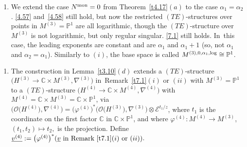 \documentclass[pdftex]{sigma}%
\numberwithin{equation}{section}
\numberwithin{figure}{section}
\newcommand{\C}{{\mathbb C}}
\renewcommand{\P}{{\mathbb P}}
\newcommand{\EE}{{\mathcal E}}
\newcommand{\OO}{{\mathcal O}}
\newcommand{\uuuu}{\underline}
\newcommand{\nnn}{\nabla}
\begin{document}
\begin{Remarks}
\begin{enumerate}
\item[$(ii)$] We extend the case $N^{\rm mon}=0$ from Theorem~\ref{t4.17}$(a)$ to the case $\alpha_1=\alpha_2$.
\eqref{4.57} and~\eqref{4.58} still hold,
but now the restricted $(TE)$-structures over
points in $M^{(3)}=\P^1$ are all logarithmic,
though the $(TE)$-structure over $M^{(3)}$ is not
logarithmic, but only regular singular.
\eqref{7.1} still holds. In~this case, the leading exponents are constant
and are $\alpha_1$ and $\alpha_1+1$
(so, not $\alpha_1$ and $ \alpha_2=\alpha_1$).
Similarly to $(i)$, the base space is called
$M^{(3),0,\alpha_1,{\rm log}}\cong\P^1$.
\end{enumerate}
\end{Remarks}


\begin{Remarks}\label{t7.2}\quad

\begin{enumerate}\itemsep=0pt
\item[$(i)$] The construction in Lemma~\ref{t3.10}$(d)$
extends a $(TE)$-structure
$\big(H^{(3)}\to\C\times M^{(3)},\nnn^{(3)}\big)$ in~Remark~\ref{t7.1}$(i)$ or $(ii)$
with $M^{(3)}=\P^1$ to a $(TE)$-structure
$\big(H^{(4)}\to\C\times M^{(4)},\nnn^{(4)}\big)$ with
$M^{(4)}=\C\times M^{(3)}=\C\times \P^1$, via
$\big(\OO\big(H^{(4)}\big),\nnn^{(4)}\big)=\big(\varphi^{(4)}\big)^*
\big(\OO\big(H^{(3)}\big),\nnn^{(3)}\big)\otimes \EE^{t_1/z}$,
where $t_1$ is the coordinate on the first factor $\C$
in $\C\times\P^1$, and where $\varphi^{(4)}\colon M^{(4)}\to
M^{(3)}$, $(t_1,t_2)\mapsto t_2,$ is the projection.
Define $\uuuu{v^{(4)}}:=\big(\varphi^{(4)}\big)^*
(\uuuu{v}\text{ in Remark~\ref{t7.1}$(i)$ or $(ii)$})$.


\end{enumerate}
\end{Remarks}
\end{document}
